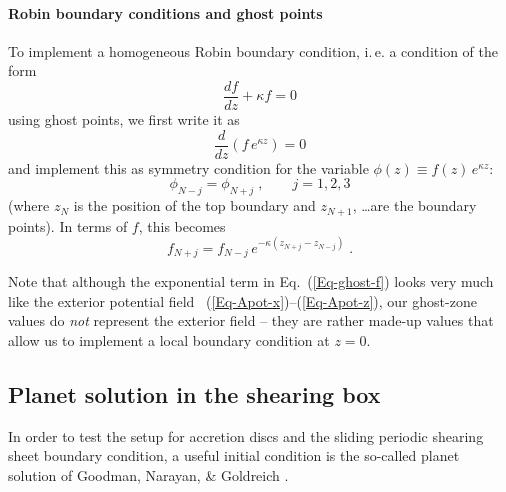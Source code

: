 \documentclass[\mydriver,12pt,twoside,notitlepage,a4paper]{article}
\begin{document}
\paragraph{Robin boundary conditions and ghost points}
To implement a homogeneous Robin boundary condition, i.\,e. a condition of
the form
\begin{equation}
  \dfrac{df}{dz} + \kappa f = 0
\end{equation}
using ghost points, we first write it as
\begin{equation}
  \dfrac{d}{dz} \left( f\,e^{\kappa z} \right)
  = 0
\end{equation}
and implement this as symmetry condition for the variable
$\phi(z) \equiv f(z)\,e^{\kappa z}$:
\begin{equation}
  \phi_{N-j} = \phi_{N+j} \; , \qquad j=1,2,3
\end{equation}
(where $z_N$ is the position of the top boundary and $z_{N+1}$, \ldots are
the boundary points).
In terms of $f$, this becomes
\begin{equation}
  \label{Eq-ghost-f}
  f_{N+j} = f_{N-j}\, e^{-\kappa(z_{N+j} - z_{N-j})} \; .
\end{equation}

Note that although the exponential term in Eq.~(\ref{Eq-ghost-f}) looks
very much like the exterior potential field
~(\ref{Eq-Apot-x})--(\ref{Eq-Apot-z}), our ghost-zone values do \emph{not}
represent the exterior field -- they are rather made-up values that allow
us to implement a local boundary condition at $z=0$.


\subsection{Planet solution in the shearing box}
\label{S-planet}

In order to test the setup for accretion discs and the sliding periodic
shearing sheet boundary condition, a useful initial condition is the
so-called planet solution of Goodman, Narayan, \& Goldreich \cite{GNG87}.
\end{document}
